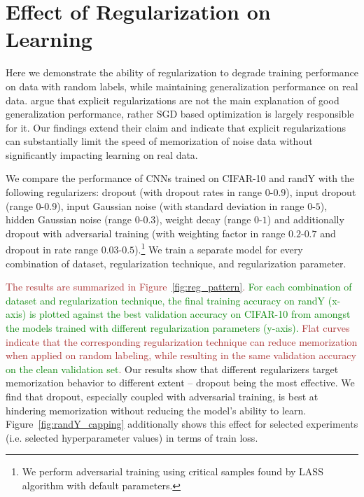 \documentclass{article}
\newcommand{\af}[1]{\textcolor{green}{#1}}
\newcommand{\da}[1]{\textcolor{brown}{#1}}
\newcommand{\af}[1]{\textcolor{black}{#1}}
\newcommand{\da}[1]{\textcolor{black}{#1}}
\begin{document}
\section{Effect of Regularization on Learning}
\label{sec:regularization}
Here we demonstrate the ability of regularization to degrade training performance on data with random labels, while maintaining generalization performance on real data.
\citet{understanding_DL} argue that explicit regularizations are not the main explanation of good generalization performance, rather SGD based optimization is largely responsible for it. Our findings extend their claim and indicate that explicit regularizations can substantially limit the speed of memorization of noise data without significantly impacting learning on real data.

{
We compare the performance of CNNs trained on CIFAR-10 and randY with the following regularizers: dropout (with dropout rates in range  $0$-$0.9$), input dropout (range $0$-$0.9$),  input Gaussian noise (with standard deviation in range $0$-$5$), hidden Gaussian noise (range $0$-$0.3$), weight decay (range $0$-$1$) and additionally dropout with adversarial training (with weighting factor in range $0.2$-$0.7$ and dropout in rate range $0.03$-$0.5$).\footnote{We perform adversarial training using critical samples found by LASS algorithm with default parameters. }
We train a separate model for every combination of dataset, regularization technique, and regularization parameter.

\da{The results are summarized in Figure~\ref{fig:reg_pattern}.
\af{For each combination of dataset and regularization technique, the final training accuracy on randY (x-axis) is plotted against the best validation accuracy on CIFAR-10 from amongst the models trained with different regularization parameters (y-axis).} 
Flat curves indicate that the corresponding regularization technique can reduce memorization when applied on random labeling, while resulting in the same validation accuracy \af{on the clean validation set}.}
Our results show that different regularizers target memorization behavior to different extent -- dropout being the most effective. 
We find that dropout, especially coupled with adversarial training, is best at hindering memorization without reducing the model's ability to learn.
Figure~\ref{fig:randY_capping} additionally shows this effect for selected experiments (i.e. selected hyperparameter values) in terms of train loss.}
\end{document}
